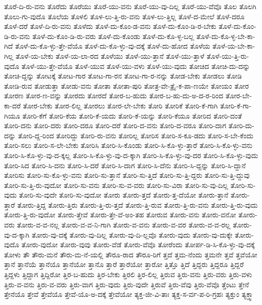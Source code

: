 {ತೊರೆ-ದಿ-ರು-ವನು
ತೊರೆದು
ತೊರೆಯು
ತೊರೆ-ಯು-ವನು
ತೊರೆ-ಯು-ವು-ದಿಲ್ಲ
ತೊರೆ-ಯು-ವೆವೊ
ತೊಲ
ತೊಲಗಿ
ತೊಲು-ಗು-ವುದೊ
ತೊಲೆಯ
ತೊಳಲಿ
ತೊಳ-ಲು-ತ್ತಿ-ರು-ವನು
ತೊಳ-ಲು-ತ್ತಿಲ್ಲ
ತೊಳೆ-ದ-ಮೇಲೆ
ತೊಳೆ-ದರೂ
ತೊಳೆ-ದರೆ
ತೊಳೆ-ದಿ-ರು-ವನು
ತೊಳೆದು
ತೊಳೆ-ದು-ಕೊಂ-ಡ-ವನು
ತೊಳೆ-ದು-ಕೊಂ-ಡಿ-ರ-ಬೇಕು
ತೊಳೆ-ದು-ಕೊಂ-ಡಿ-ರು-ವನು
ತೊಳೆ-ದು-ಕೊಂ-ಡಿ-ರು-ವರು
ತೊಳೆ-ದು-ಕೊಂಡು
ತೊಳೆ-ದು-ಕೊ-ಳ್ಳ-ಬಲ್ಲ
ತೊಳೆ-ದು-ಕೊ-ಳ್ಳ-ಬೇ-ಕಾ-ಗಿದೆ
ತೊಳೆ-ದು-ಕೊ-ಳ್ಳು-ತ್ತೇ-ವೆಯೊ
ತೊಳೆ-ದು-ಕೊ-ಳ್ಳು-ವು-ದಕ್ಕೆ
ತೊಳೆ-ದು-ಹೋದ
ತೊಳೆಯ
ತೊಳೆ-ಯ-ಬೇ-ಕಾ-ಗಿಲ್ಲ
ತೊಳೆ-ಯ-ಬೇಕು
ತೊಳೆ-ಯ-ಲಾ-ರದ
ತೊಳೆಯು
ತೊಳೆ-ಯು-ತ್ತಾನೆ
ತೊಳೆ-ಯು-ತ್ತಾಳೆ
ತೊಳೆ-ಯು-ತ್ತಿ-ರು-ವುದೊ
ತೊಳೆ-ಯು-ತ್ತೇ-ವೆಯೊ
ತೊಳೆ-ಯುವ
ತೊಳೆ-ಯು-ವಳು
ತೊಳೆ-ಯು-ವುದು
ತೋಚಿದ
ತೋಚಿ-ದು-ದನ್ನು
ತೋಚಿ-ದ್ದನ್ನು
ತೋಟಕ್ಕೆ
ತೋಟ-ಗಾರ
ತೋಟ-ಗಾ-ರನ
ತೋಟ-ಗಾ-ರ-ನನ್ನು
ತೋಡ-ಬೇಕು
ತೋಡಲು
ತೋಡಿ
ತೋಡಿ-ರುವ
ತೋಡುತ್ತಾ
ತೋಡು-ವನು
ತೋತಾ
ತೋತಾ-ಪುರಿ
ತೋತ್ರ-ವೇ-ತ್ರೈ-ಕ-ಪಾ-ಣಯೇ
ತೋಯಂ
ತೋರ
ತೋರಣ
ತೋರ-ಣ-ವನ್ನು
ತೋರದು
ತೋರದೆ
ತೋರ-ಬ-ಹುದು
ತೋರ-ಬ-ಹು-ದು-ಅ-ದ-ರ-ರಿಂದ
ತೋರ-ಬೇ-ಕಾ-ದರೆ
ತೋರ-ಬೇಕು
ತೋರ-ಲಿಲ್ಲ
ತೋರಲು
ತೋರ-ಲೇ-ಬೇಕು
ತೋರಿ
ತೋರಿಕೆ
ತೋರಿ-ಕೆ-ಗಾಗಿ
ತೋರಿ-ಕೆ-ಗಾ-ಗಿಯೂ
ತೋರಿ-ಕೆಗೆ
ತೋರಿ-ಕೆಯ
ತೋರಿ-ಕೆ-ಯದು
ತೋರಿ-ಕೆ-ಯನ್ನು
ತೋರಿ-ಕೆಯೂ
ತೋರಿದ
ತೋರಿ-ದಂತೆ
ತೋರಿ-ದನು
ತೋರಿ-ದರು
ತೋರಿ-ದರೂ
ತೋರಿ-ದರೆ
ತೋರಿ-ದ-ವನು
ತೋರಿ-ದ-ವರೂ
ತೋರಿ-ದಾಗ
ತೋರಿ-ದು-ದನ್ನು
ತೋರಿ-ದ್ದ-ರಿಂದ
ತೋರಿದ್ದು
ತೋರಿ-ರು-ವನು
ತೋರಿಲ್ಲ
ತೋರಿಸ
ತೋರಿ-ಸ-ಕೂ-ಡದು
ತೋರಿ-ಸ-ಬೇ-ಕೆಂದು
ತೋರಿ-ಸಲು
ತೋರಿ-ಸ-ಲೇ-ಬೇಕು
ತೋರಿಸಿ
ತೋರಿ-ಸಿ-ಕೊಂಡು
ತೋರಿ-ಸಿ-ಕೊ-ಳ್ಳು-ತ್ತಾರೆ
ತೋರಿ-ಸಿ-ಕೊ-ಳ್ಳು-ವನು
ತೋರಿ-ಸಿ-ಕೊ-ಳ್ಳು-ವು-ದ-ಕ್ಕಲ್ಲ
ತೋರಿ-ಸಿ-ಕೊ-ಳ್ಳು-ವು-ದ-ಕ್ಕಾಗಿ
ತೋರಿ-ಸಿ-ಕೊ-ಳ್ಳು-ವು-ದರ
ತೋರಿ-ಸಿ-ಕೊ-ಳ್ಳು-ವುದು
ತೋರಿ-ಸಿದ
ತೋರಿ-ಸಿ-ದನು
ತೋರಿ-ಸಿ-ದರೆ
ತೋರಿ-ಸಿ-ದಾಗ
ತೋರಿ-ಸಿ-ದೆನು
ತೋರಿ-ಸಿ-ದ್ದನ್ನು
ತೋರಿ-ಸಿ-ದ್ದಾನೆ
ತೋರಿಸು
ತೋರಿ-ಸು-ಕೊ-ಳ್ಳು-ವನು
ತೋರಿ-ಸು-ತ್ತಾನೆ
ತೋರಿ-ಸು-ತ್ತಿದೆ
ತೋರಿ-ಸು-ತ್ತಿ-ದ್ದರು
ತೋರಿ-ಸು-ತ್ತಿ-ದ್ದುವು
ತೋರಿ-ಸು-ತ್ತಿ-ರು-ವುದೋ
ತೋರಿ-ಸು-ವನು
ತೋರಿ-ಸು-ವ-ವರು
ತೋರಿ-ಸು-ವಿರಾ
ತೋರಿ-ಸು-ವು-ದಿಲ್ಲ
ತೋರಿ-ಸು-ವುದು
ತೋರಿ-ಸು-ವುದೇ
ತೋರಿ-ಸು-ವುದೋ
ತೋರು
ತೋರು-ತ್ತದೆ
ತೋರು-ತ್ತ-ದೆಯೋ
ತೋರು-ತ್ತಾನೆ
ತೋರು-ತ್ತಾರೆ
ತೋರು-ತ್ತಿದ್ದ
ತೋರು-ತ್ತಿರು
ತೋರು-ತ್ತಿ-ರು-ತ್ತದೆ
ತೋರು-ತ್ತಿ-ರುವ
ತೋರು-ತ್ತಿ-ರು-ವನು
ತೋರು-ತ್ತಿ-ರು-ವುದು
ತೋರು-ತ್ತಿ-ರು-ವುದೋ
ತೋರು-ತ್ತೇವೆ
ತೋರು-ತ್ತೇ-ವೆ-ಅಂ-ತಹ
ತೋರುವ
ತೋರು-ವನು
ತೋರು-ವನೋ
ತೋರು-ವರು
ತೋರು-ವ-ವ-ನಲ್ಲ
ತೋರು-ವ-ವ-ನಿ-ಗಾಗಿ
ತೋರು-ವ-ವನು
ತೋರು-ವ-ವರ
ತೋರು-ವ-ವ-ರಲ್ಲ
ತೋರು-ವು-ದ-ಕ್ಕಾಗಿ
ತೋರು-ವು-ದಕ್ಕೆ
ತೋರು-ವು-ದಿಲ್ಲ
ತೋರು-ವು-ದಿ-ಲ್ಲವೊ
ತೋರು-ವುದು
ತೋರು-ವು-ದುಕ್ಕೇ
ತೋರು-ವುದೊ
ತೋರು-ವುದೋ
ತೋರು-ವುವು
ತೋರು-ವೆಡೆ
ತೋರು-ವೆವೊ
ತೋರೆಂದು
ತೋರ್ಪ-ಡಿ-ಸಿ-ಕೊ-ಳ್ಳು-ವು-ದಕ್ಕೆ
ತೋಳು
ತೌ
ತೌರು-ಮನೆ
ತೌರು-ಮ-ನೆ-ಯಲ್ಲಿ
ತೌರೂ-ರಾದ
ತೌರೂ-ರಿಗೆ
ತ್ತದೆ
ತ್ತಮ-ನೆಂದು
ತ್ತಮನೇ
ತ್ತವೆ
ತ್ತವೆಯೋ
ತ್ತಾನೆ
ತ್ತಾನೆಯೆ
ತ್ತಾನೆಯೊ
ತ್ತಾನೆಯೋ
ತ್ತಾನೊ
ತ್ತಾರೆ
ತ್ತಾರೆಯೋ
ತ್ತಾರೋ
ತ್ತಿತ್ತೊ
ತ್ತಿದೆ
ತ್ತಿದ್ದರು
ತ್ತಿದ್ದರೂ
ತ್ತಿದ್ದರೆ
ತ್ತಿದ್ದಳು
ತ್ತಿದ್ದಾಗ
ತ್ತಿದ್ದಿರೋ
ತ್ತಿರ-ಬ-ಹುದು
ತ್ತಿರ-ಬೇಕು
ತ್ತಿರಲಿ
ತ್ತಿರ-ಲಿಲ್ಲ
ತ್ತಿರುವ
ತ್ತಿರು-ವನು
ತ್ತಿರು-ವರು
ತ್ತಿರು-ವಳು
ತ್ತಿರು-ವ-ವನು
ತ್ತಿರು-ವ-ವರು
ತ್ತಿರು-ವಾಗ
ತ್ತಿರು-ವುದು
ತ್ತಿರು-ವುದೇ
ತ್ತಿರುವೆ
ತ್ತಿರು-ವೆವು
ತ್ತಿರು-ವೆವೊ
ತ್ತೆಂಟು
ತ್ತೇನೆ
ತ್ತೇನೆಯೊ
ತ್ತೇವೆ
ತ್ತೇವೆಯೊ
ತ್ತೇವೆ-ಯೊ-ಅ-ದಕ್ಕೆ
ತ್ತೇವೆಯೋ
ತ್ಯಕ್ತ-ಜೀ-ವಿ-ತಾಃ
ತ್ಯಕ್ತ-ಸ-ರ್ವ-ಪ-ರಿ-ಗ್ರಹಃ
ತ್ಯಕ್ತುಂ
ತ್ಯಕ್ತ್ವಾ
}
